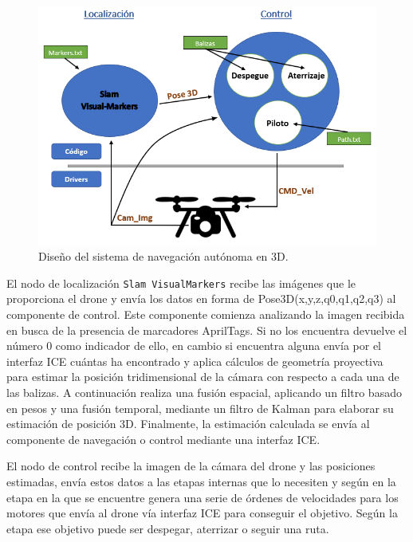 \begin{figure}[H]
	\begin{center}
		\includegraphics[width=1.1\textwidth]{imag/IMG80.PNG}
				\caption{Diseño del sistema de navegación autónoma en 3D.}
		\label{fig:Esquema representativo.}	
	\end{center}
\end{figure}

\hspace{1cm} El nodo de localización \texttt{Slam VisualMarkers} recibe las imágenes que le proporciona el drone y envía los datos en forma de Pose3D(x,y,z,q0,q1,q2,q3) al componente de control. Este componente comienza analizando la imagen recibida en busca de la presencia de marcadores AprilTags. Si no los encuentra devuelve el número 0 como indicador de ello, en cambio si encuentra alguna envía por el interfaz ICE cuántas ha encontrado y aplica cálculos de geometría proyectiva para estimar la posición tridimensional de la cámara con respecto a cada una de las balizas. A continuación realiza una fusión espacial, aplicando un filtro basado en pesos y una fusión temporal, mediante un filtro de Kalman para elaborar su estimación de posición 3D. Finalmente, la estimación calculada se envía al componente de navegación o control mediante una interfaz ICE.

\hspace{1cm} El nodo de control recibe la imagen de la cámara del drone y las posiciones estimadas, envía estos datos a las etapas internas que lo necesiten y según en la etapa en la que se encuentre genera una serie de órdenes de velocidades para los motores que envía al drone vía interfaz ICE para conseguir el objetivo. Según la etapa ese objetivo puede ser despegar, aterrizar o seguir una ruta.

